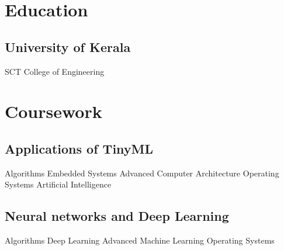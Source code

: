 \documentclass[]{plushcv}
\begin{document}
\begin{minipage}[t]{0.25\textwidth}
\sectionsep


\section{Education} 
\subsection{University of Kerala}
SCT College of Engineering \\



\section{Coursework}
\subsection{Applications of TinyML}
Algorithms \textbullet{} Embedded Systems \textbullet{} 
Advanced Computer Architecture \textbullet{}
Operating Systems \textbullet{}
Artificial Intelligence 
\sectionsep
\subsection{Neural networks and Deep Learning}

Algorithms \textbullet{} Deep Learning \textbullet{} 
Advanced Machine Learning \textbullet{}
Operating Systems \textbullet{}
\sectionsep




\end{minipage}
\end{document}
